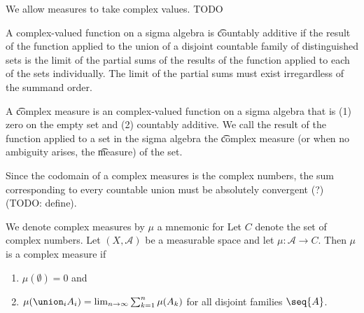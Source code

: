 

We allow measures to take
complex values.
TODO


A complex-valued
function on a
sigma algebra is
\t{countably additive}
if the result of the function applied to
the union of a disjoint countable family of
distinguished sets is the limit of the partial
sums of the results of the function applied
to each of the sets individually.
The limit of the partial sums must
exist irregardless of the summand order.

A
\t{complex measure}
is an complex-valued
function on a
sigma algebra that is
(1) zero on the empty set and
(2) countably additive.
We call the result of the function
applied to a set in the sigma
algebra the
\t{complex measure}
(or when no ambiguity arises, the
\t{measure})
of the set.

Since the codomain of
a complex measures is
the complex numbers,
the sum corresponding
to every countable union
must be absolutely convergent (?)
(TODO: define).


We denote complex measures by $\mu$
a mnemonic for 
Let $C$ denote the set
of complex numbers.
Let
$(X, \mathcal{A})$
be a measurable space
and let
$\mu: \mathcal{A} \to C$.
Then $\mu$ is a complex measure if
\begin{enumerate}
  \item $\mu(\emptyset) = 0$ and
  \item
  $\mu(\union_{i} A_i) =
    \lim_{n \to \infty}
      \sum_{k = 1}^{n} \mu(A_k)$
  for all disjoint families $\seq{A}$.
\end{enumerate}
